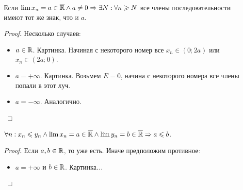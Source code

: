 \begin{theorem}
    Если $\lim x_n = a \in \overline{\mathbb{R}} \land a \neq 0 \Rightarrow \exists N: \forall n \geqslant N$ все члены последовательности имеют тот же знак, что и $a$.
\end{theorem}
\begin{proof}
    Несколько случаев:
     \begin{itemize}
         \item $a \in \mathbb{R}$. Картинка. Начиная с некоторого номер все  $x_n \in (0; 2a)$ или  $x_n \in (2a; 0)$.
         \item  $a = +\infty$. Картинка. Возьмем  $E=0$, начина с некоторого номера все члены попали в этот луч.
         \item  $a = -\infty$. Аналогично.
    \end{itemize}
\end{proof}
\begin{theorem}
    $\forall n: x_n \leqslant y_n \land \lim x_n = a \in \overline{\mathbb{R}} \land \lim y_n = b \in \overline{\mathbb{R}} \Rightarrow a \leqslant b$.
\end{theorem}
\begin{proof}
    Если $a, b \in \mathbb{R}$, то уже есть. Иначе предположим противное:
     \begin{itemize}
         \item $a = +\infty$ и  $b \in \mathbb{R}$. Картинка...
    \end{itemize}
\end{proof}

